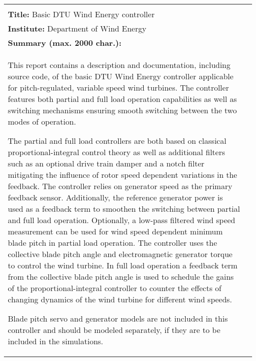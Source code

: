 \thispagestyle{empty}

\begin{tabular}{l|l}
\small
%
\begin{minipage}[t][22cm][t]{9cm}
  \raggedright
  \textbf{Author(s):} Morten Hartvig Hansen and Lars Christian Henriksen\\
  \textbf{Title:} Basic DTU Wind Energy controller \\
  \textbf{Institute:} Department of Wind Energy \\[2em]
  \textbf{Summary (max. 2000 char.):} \\
 This report contains a description and documentation, including source code, of the basic DTU Wind Energy controller applicable for pitch-regulated, variable speed wind turbines. The controller features both partial and full load operation capabilities as well as switching mechanisms ensuring smooth switching between the two modes of operation. 
 
The partial and full load controllers are both based on classical proportional-integral control theory as well as additional filters such as an optional drive train damper and a notch filter mitigating the influence of rotor speed dependent variations in the feedback. The controller relies on generator speed as the primary feedback sensor. Additionally, the reference generator power is used as a feedback term to smoothen the switching between partial and full load operation. Optionally, a low-pass filtered wind speed measurement can be used for wind speed dependent minimum blade pitch in partial load operation. The controller uses the collective blade pitch angle and electromagnetic generator torque to control the wind turbine. In full load operation a feedback term from the collective blade pitch angle is used to schedule the gains of the proportional-integral controller to counter the effects of changing dynamics of the wind turbine for different wind speeds. 

Blade pitch servo and generator models are not included in this controller and should be modeled separately, if they are to be included in the simulations.


\end{minipage}
\end{tabular}
